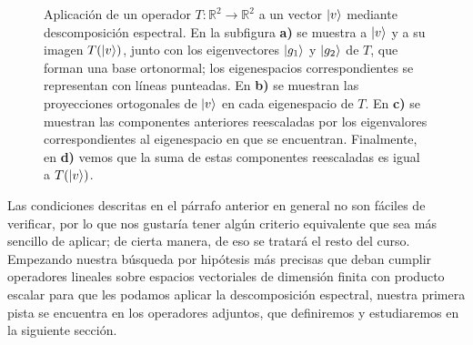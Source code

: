 \documentclass[12pt,libertine]{book}
\begin{document}
\begin{figure}[h!]
\hspace{3mm}
\caption{Aplicación de un operador $T:\mathbb{R}^2\to \mathbb{R}^2$ a un vector $\ket{v}$ mediante descomposición espectral. En la subfigura \textbf{a)} se muestra a $\ket{v}$ y a su imagen $T(\ket{v})$, junto con los eigenvectores $\ket{g_1}$ y $\ket{g_2}$ de $T$, que forman una base ortonormal; los eigenespacios correspondientes se representan con líneas punteadas. En \textbf{b)} se muestran las proyecciones ortogonales de $\ket{v}$ en cada eigenespacio de $T$. En \textbf{c)} se muestran las componentes anteriores reescaladas por los eigenvalores correspondientes al eigenespacio en que se encuentran. Finalmente, en \textbf{d)} vemos que la suma de estas componentes reescaladas es igual a $T(\ket{v})$.}
    \label{fig:8}
\end{figure}

\vspace{3mm}
Las condiciones descritas en el párrafo anterior en general no son fáciles de verificar, por lo que nos gustaría tener algún criterio equivalente que sea más sencillo de aplicar; de cierta manera, de eso se tratará el resto del curso. Empezando nuestra búsqueda por hipótesis más precisas que deban cumplir operadores lineales sobre espacios vectoriales de dimensión finita con producto escalar para que les podamos aplicar la descomposición espectral, nuestra primera pista se encuentra en los operadores adjuntos, que definiremos y estudiaremos en la siguiente sección.
\end{document}
